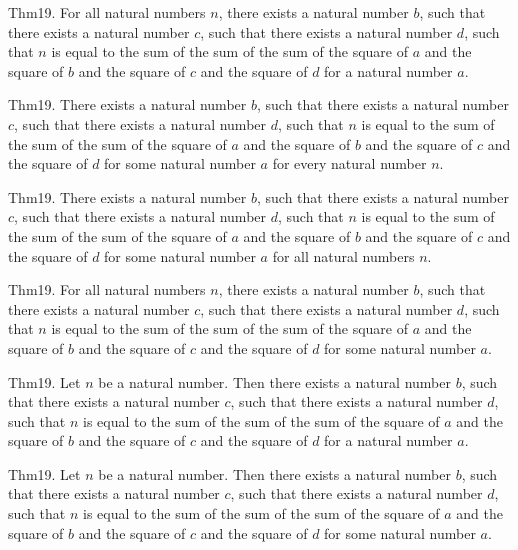 \documentclass{article}
\begin{document}
Thm19. For all natural numbers $n$, there exists a natural number $b$, such that there exists a natural number $c$, such that there exists a natural number $d$, such that $n$ is equal to the sum of the sum of the sum of the square of $a$ and the square of $b$ and the square of $c$ and the square of $d$ for a natural number $a$.

Thm19. There exists a natural number $b$, such that there exists a natural number $c$, such that there exists a natural number $d$, such that $n$ is equal to the sum of the sum of the sum of the square of $a$ and the square of $b$ and the square of $c$ and the square of $d$ for some natural number $a$ for every natural number $n$.

Thm19. There exists a natural number $b$, such that there exists a natural number $c$, such that there exists a natural number $d$, such that $n$ is equal to the sum of the sum of the sum of the square of $a$ and the square of $b$ and the square of $c$ and the square of $d$ for some natural number $a$ for all natural numbers $n$.

Thm19. For all natural numbers $n$, there exists a natural number $b$, such that there exists a natural number $c$, such that there exists a natural number $d$, such that $n$ is equal to the sum of the sum of the sum of the square of $a$ and the square of $b$ and the square of $c$ and the square of $d$ for some natural number $a$.

Thm19. Let $n$ be a natural number. Then there exists a natural number $b$, such that there exists a natural number $c$, such that there exists a natural number $d$, such that $n$ is equal to the sum of the sum of the sum of the square of $a$ and the square of $b$ and the square of $c$ and the square of $d$ for a natural number $a$.

Thm19. Let $n$ be a natural number. Then there exists a natural number $b$, such that there exists a natural number $c$, such that there exists a natural number $d$, such that $n$ is equal to the sum of the sum of the sum of the square of $a$ and the square of $b$ and the square of $c$ and the square of $d$ for some natural number $a$.
\end{document}
